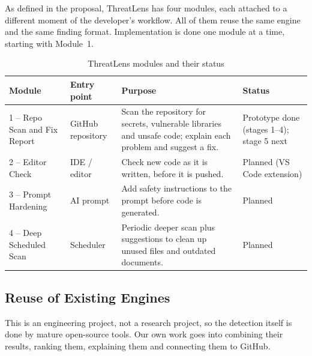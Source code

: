 \documentclass[12pt,a4paper]{article}
\begin{document}
As defined in the proposal, ThreatLens has four modules, each attached to a different moment of the developer's workflow. All of them reuse the same engine and the same finding format. Implementation is done one module at a time, starting with Module~1.

\begin{table}[H]
\centering
\caption{ThreatLens modules and their status}
\label{tab:modules}
\begin{tabularx}{\textwidth}{@{}p{3.0cm}p{2.3cm}Xp{2.8cm}@{}}
\toprule
\textbf{Module} & \textbf{Entry point} & \textbf{Purpose} & \textbf{Status} \\
\midrule
1 -- Repo Scan and Fix Report & GitHub repository & Scan the repository for secrets, vulnerable libraries and unsafe code; explain each problem and suggest a fix. & Prototype done (stages 1--4); stage 5 next \\
2 -- Editor Check & IDE / editor & Check new code as it is written, before it is pushed. & Planned (VS Code extension) \\
3 -- Prompt Hardening & AI prompt & Add safety instructions to the prompt before code is generated. & Planned \\
4 -- Deep Scheduled Scan & Scheduler & Periodic deeper scan plus suggestions to clean up unused files and outdated documents. & Planned \\
\bottomrule
\end{tabularx}
\end{table}

\subsection{Reuse of Existing Engines}

This is an engineering project, not a research project, so the detection itself is done by mature open-source tools. Our own work goes into combining their results, ranking them, explaining them and connecting them to GitHub.
\end{document}
